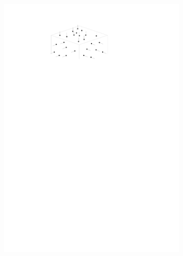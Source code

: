 \begin{figure}
\begin{subfigure}[b]{0.3\linewidth}
    \includegraphics[width=\textwidth,page=2]{normal.pdf}
    \caption{}\label{fig:normal:b}
  \end{subfigure}
  \qquad
  \begin{subfigure}[b]{0.3\linewidth}
    \centering

\end{subfigure}
\end{figure}
